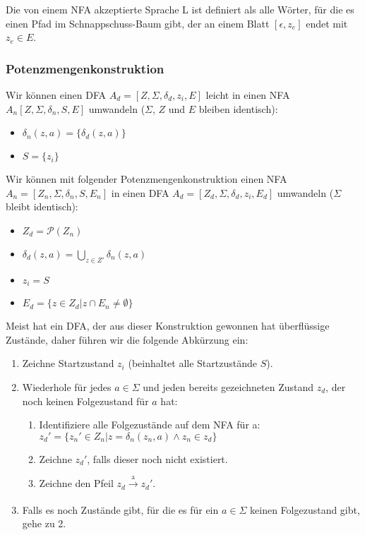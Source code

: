 Die von einem NFA akzeptierte Sprache L ist definiert als alle Wörter,
für die es einen Pfad im Schnappschuss-Baum gibt,
der an einem Blatt $[\epsilon, z_e]$ endet mit $z_e \in E$.

\subsubsection{Potenzmengenkonstruktion}
Wir können einen DFA $A_d = [Z, \Sigma, \delta_d, z_i, E]$
leicht in einen NFA $A_n [Z, \Sigma, \delta_n, S, E]$ umwandeln
($\Sigma$, $Z$ und $E$ bleiben identisch):
\begin{itemize}
    \item $\delta_n(z, a) = \{\delta_d(z, a)\}$
    \item $S = \{z_i\}$
\end{itemize}

Wir können mit folgender Potenzmengenkonstruktion
einen NFA $A_n =  [Z_n, \Sigma, \delta_n, S, E_n]$ in
einen DFA $A_d = [Z_d, \Sigma, \delta_d, z_i, E_d]$
umwandeln
($\Sigma$ bleibt identisch):
\begin{itemize}
    \item $Z_d = \mathcal{P}(Z_n)$
    \item $\delta_d(z, a) = \bigcup\limits_{z \in Z'} \delta_n(z, a)$
    \item $z_i = S$
    \item $E_d = \{z \in Z_d| z \cap E_n \neq \emptyset \}$
\end{itemize}

Meist hat ein DFA,
der aus dieser Konstruktion gewonnen hat überflüssige Zustände,
daher führen wir die folgende Abkürzung ein:
\begin{enumerate}
    \item Zeichne Startzustand $z_i$ (beinhaltet alle Startzustände $S$).
    \item Wiederhole für jedes $a \in \Sigma$ und jeden bereits gezeichneten Zustand $z_d$,
        der noch keinen Folgezustand für $a$ hat:
        \begin{enumerate}
            \item Identifiziere alle Folgezustände auf dem NFA für a:\\
                $z_d' = \{z_n' \in Z_n| z = \delta_n(z_n,a) \wedge z_n \in z_d\}$\\
            \item Zeichne $z_d'$, falls dieser noch nicht existiert.
            \item Zeichne den Pfeil $z_d \xrightarrow[]{\text{a}} z_d'$.
        \end{enumerate}
    \item Falls es noch Zustände gibt, für die es für ein $a \in \Sigma$ keinen Folgezustand gibt,
        gehe zu 2.
\end{enumerate}


